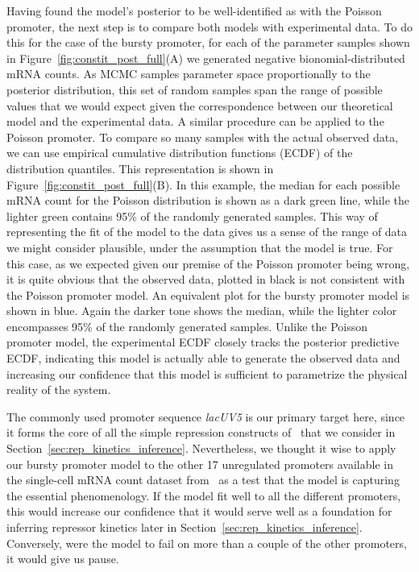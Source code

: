 Having found the model's posterior to be well-identified as with the Poisson
promoter, the next step is to compare both models with experimental data. To do
this for the case of the bursty promoter, for each of the parameter samples
shown in Figure~\ref{fig:constit_post_full}(A) we generated negative
bionomial-distributed mRNA counts. As MCMC samples parameter space
proportionally to the posterior distribution, this set of random samples span
the range of possible values that we would expect given the correspondence
between our theoretical model and the experimental data. A similar procedure can
be applied to the Poisson promoter. To compare so many samples with the actual
observed data, we can use empirical cumulative distribution functions (ECDF) of
the distribution quantiles. This representation is shown in
Figure~\ref{fig:constit_post_full}(B). In this example, the median for each
possible mRNA count for the Poisson distribution is shown as a dark green line,
while the lighter green contains 95\% of the randomly generated samples. This
way of representing the fit of the model to the data gives us a sense of the
range of data we might consider plausible, under the assumption that the model
is true. For this case, as we expected given our premise of the Poisson promoter
being wrong, it is quite obvious that the observed data, plotted in black is not
consistent with the Poisson promoter model. An equivalent plot for the bursty
promoter model is shown in blue. Again the darker tone shows the median, while
the lighter color encompasses 95\% of the randomly generated samples. Unlike the
Poisson promoter model, the experimental ECDF closely tracks the posterior
predictive ECDF, indicating this model is actually able to generate the observed
data and increasing our confidence that this model
is sufficient to parametrize the physical reality of the system.

The commonly used promoter sequence \textit{lacUV5} is our primary
target here, since it forms the core of all the
simple repression constructs of~\cite{Jones2014} that we consider in
Section~\ref{sec:rep_kinetics_inference}. Nevertheless, we thought it wise to
apply our bursty promoter model to the other 17 unregulated promoters available
in the single-cell mRNA count dataset from~\cite{Jones2014} as a test that the
model is capturing the essential phenomenology. If the model fit well to all the
different promoters, this would increase our confidence that it would serve well
as a foundation for inferring repressor kinetics later in
Section~\ref{sec:rep_kinetics_inference}. Conversely, were the model to fail on
more than a couple of the other promoters, it would give us pause.

